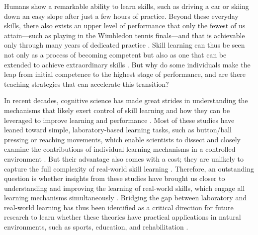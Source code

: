 
Humans show a remarkable ability to learn skills, such as driving a car or skiing down an easy slope after just a few hours of practice. Beyond these everyday skills, there also exists an upper level of performance that only the fewest of us attain—such as playing in the Wimbledon tennis finals—and that is achievable only through many years of dedicated practice \cite{hodges_predicting_2004, ericsson_role_1993, vaeyens_talent_2009}. Skill learning can thus be seen not only as a process of becoming competent but also as one that can be extended to achieve extraordinary skills \cite{ericsson_development_2003, ericsson_scientific_1998}. But why do some individuals make the leap from initial competence to the highest stage of performance, and are there teaching strategies that can accelerate this transition?

In recent decades, cognitive science has made great strides in understanding the mechanisms that likely exert control of skill learning and how they can be leveraged to improve learning and performance \cite{wolpert_principles_2011, makino_circuit_2016, spampinato_multiple_2021, krakauer_motor_2019, haith_model-based_2013, huang_rethinking_2011, shmuelof_are_2011, doya_complementary_2000}. Most of these studies have leaned toward simple, laboratory-based learning tasks\cite{krakauer_motor_2019, du_relationship_2022}, such as button/ball pressing \cite{hardwick_time-dependent_2019, vassiliadis_reward_2021} or reaching movements\cite{shadmehr_adaptive_1994, krakauer_learning_2000},  which enable scientists to dissect and closely examine the contributions of individual learning mechanisms in a controlled environment \cite{spampinato_multiple_2021}. But their advantage also comes with a cost; they are unlikely to capture the full complexity of real-world skill learning \cite{krakauer_motor_2019, mangalam_investigating_2023, du_relationship_2022, chen_effects_2018, wolpert_principles_2011, gallivan_decision-making_2018, iyer_probing_2020, ingram_naturalistic_2011}. Therefore, an outstanding question is whether insights from these studies have brought us closer to understanding and improving the learning of real-world skills, which engage all learning mechanisms simultaneously \cite{spampinato_multiple_2021}. Bridging the gap between laboratory and real-world learning has thus been identified as a critical direction for future research to learn whether these theories have practical applications in natural environments, such as sports, education, and rehabilitation \cite{du_relationship_2022, wolpert_motor_2010, yarrow_inside_2009, haar_motor_2020, ingram_naturalistic_2011}.

